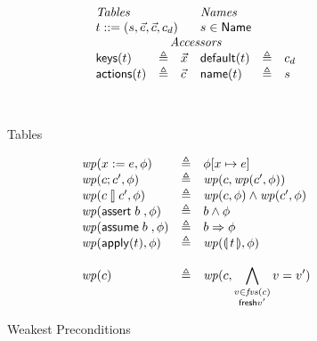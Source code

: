 \begin{figure}[ht]
  \[\begin{array}{l >{\triangleq}c l l >{\triangleq}c l}
      \multicolumn 3 l {\textit{Tables}}  & \multicolumn 3 l {\textit{Names}}\\
      \multicolumn 3 l {t::= (s,\vec e, \vec c, c_d)} & \multicolumn 3 l {s \in \Name}\\
      \multicolumn 6 c {\textit{Accessors}}\\
      \keys t && \vec x &  \default t && c_d \\
      \actions t && \vec c & \name t && s \\\\
 \\
      
    \end{array}\]

  \caption{Tables}
  \label{fig:tables}
\end{figure}

\begin{figure}[ht]
  \[\begin{array}{l >{\triangleq}c l}
      \wp(x:=e, \phi) && \phi[x \mapsto e]\\
      \wp(c;c', \phi) && \wp(c, \wp(c', \phi)) \\
      \wp(c\angel c', \phi) && \wp(c, \phi) \wedge \wp(c',\phi) \\
      \wp(\assert b, \phi) && b \wedge \phi \\
      \wp(\assume b, \phi) && b \Rightarrow \phi \\
      \wp(\apply t, \phi) && \wp(\parenbb t, \phi) \\\\
      
      \wp(c) && \wp(c,\displaystyle \bigwedge_{\substack{v \in \fvs(c) \\ \mathsf{fresh} v'}}
      v = v')
    \end{array}\]
  \caption{Weakest Preconditions}
  \label{fig:wp}
\end{figure}


